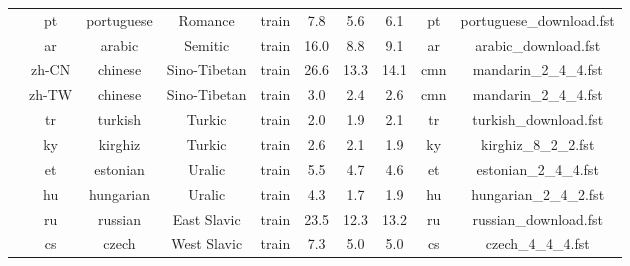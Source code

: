 \begin{table}[h!]
\begin{center}
\begin{tabular}{@{}cccccccccc@{}}
                                  & pt                             & portuguese                     & Romance       &train                   & 7.8        & 5.6        & 6.1      & pt        & portuguese\_download.fst    \\
                                  & ar                             & arabic                         & Semitic       &train                   & 16.0       & 8.8        & 9.1      & ar        & arabic\_download.fst        \\
                                  & zh-CN                          & chinese                        & Sino-Tibetan   &train                  & 26.6       & 13.3       & 14.1     & cmn       & mandarin\_2\_4\_4.fst       \\
                                  & zh-TW                          & chinese                        & Sino-Tibetan   &train                  & 3.0        & 2.4        & 2.6      & cmn       & mandarin\_2\_4\_4.fst       \\
                                  & tr                             & turkish                        & Turkic         &train                  & 2.0        & 1.9        & 2.1      & tr        & turkish\_download.fst       \\
                                  & ky                             & kirghiz                        & Turkic         &train                  & 2.6        & 2.1        & 1.9      & ky        & kirghiz\_8\_2\_2.fst    \\
                                  & et                             & estonian                       & Uralic        &train                   & 5.5        & 4.7        & 4.6      & et        & estonian\_2\_4\_4.fst       \\
                                  & hu                             & hungarian                      & Uralic         &train                  & 4.3        & 1.7        & 1.9      & hu        & hungarian\_2\_4\_2.fst      \\
                                  & ru                             & russian                        & East Slavic     &train                 & 23.5       & 12.3       & 13.2     & ru        & russian\_download.fst       \\
                                  & cs                             & czech                          & West Slavic     &train                 & 7.3        & 5.0        & 5.0      & cs        & czech\_4\_4\_4.fst          \\

\end{tabular}
\end{center}
\end{table}
